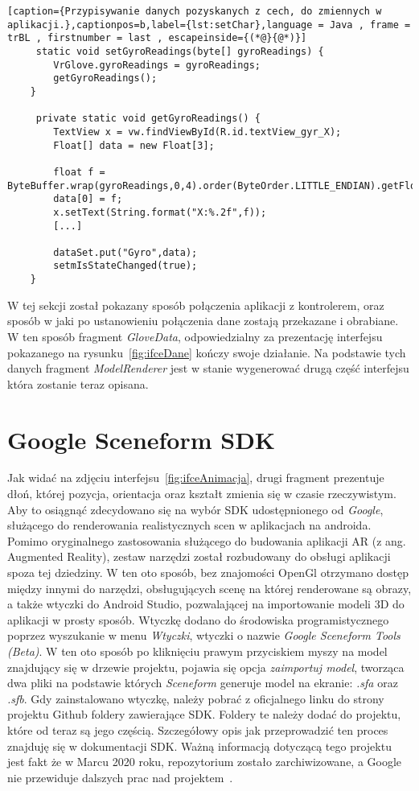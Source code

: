 \begin{lstlisting}[caption={Przypisywanie danych pozyskanych z cech, do zmiennych w aplikacji.},captionpos=b,label={lst:setChar},language = Java , frame = trBL , firstnumber = last , escapeinside={(*@}{@*)}]     
     static void setGyroReadings(byte[] gyroReadings) {
        VrGlove.gyroReadings = gyroReadings;
        getGyroReadings();
    }      
    
     private static void getGyroReadings() {
        TextView x = vw.findViewById(R.id.textView_gyr_X);
        Float[] data = new Float[3];
        
        float f = ByteBuffer.wrap(gyroReadings,0,4).order(ByteOrder.LITTLE_ENDIAN).getFloat();
        data[0] = f;
        x.setText(String.format("X:%.2f",f));
      	[...]

        dataSet.put("Gyro",data);
        setmIsStateChanged(true);
    }                                      
\end{lstlisting}

W tej sekcji został pokazany sposób połączenia aplikacji z kontrolerem, oraz sposób w jaki po ustanowieniu połączenia dane zostają przekazane i obrabiane. W ten sposób fragment \textit{GloveData}, odpowiedzialny za prezentację interfejsu pokazanego na rysunku~\ref{fig:ifceDane} kończy swoje działanie. Na podstawie tych danych fragment \textit{ModelRenderer} jest w stanie wygenerować drugą część interfejsu która zostanie teraz opisana.

\section{Google Sceneform SDK}
\label{sec:sceneform}
Jak widać na zdjęciu interfejsu~\ref{fig:ifceAnimacja}, drugi fragment prezentuje dłoń, której pozycja, orientacja oraz kształt zmienia się w czasie rzeczywistym. Aby to osiągnąć zdecydowano się na wybór SDK udostępnionego od \textit{Google}, służącego do renderowania realistycznych scen w aplikacjach na androida. Pomimo oryginalnego zastosowania służącego do budowania aplikacji AR (z ang. Augmented Reality), zestaw narzędzi został rozbudowany do obsługi aplikacji spoza tej dziedziny. W ten oto sposób, bez znajomości OpenGl otrzymano dostęp między innymi do narzędzi, obsługujących scenę na której renderowane są obrazy, a także wtyczki do Android Studio, pozwalającej na importowanie modeli 3D do aplikacji w prosty sposób. Wtyczkę dodano do środowiska programistycznego poprzez wyszukanie w menu \textit{Wtyczki}, wtyczki o nazwie \textit{Google Sceneform Tools (Beta)}. W ten oto sposób po kliknięciu prawym przyciskiem myszy na model znajdujący się w drzewie projektu, pojawia się opcja \textit{zaimportuj model}, tworząca dwa pliki na podstawie których \textit{Sceneform} generuje model na ekranie: \textit{.sfa} oraz \textit{.sfb}. Gdy zainstalowano wtyczkę, należy pobrać z oficjalnego linku do strony projektu Github foldery zawierające SDK. Foldery te należy dodać do projektu, które od teraz są jego częścią. Szczegółowy opis jak przeprowadzić ten proces znajduję się w dokumentacji SDK. Ważną informacją dotyczącą tego projektu jest fakt że w Marcu 2020 roku, repozytorium zostało zarchiwizowane, a Google nie przewiduje dalszych prac nad projektem~\cite{sceneform}. 
